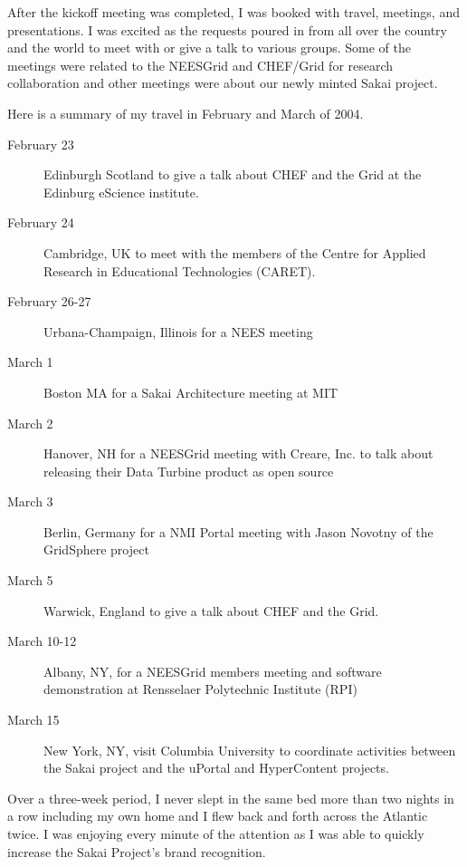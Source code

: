 \documentclass[12pt]{book}
\begin{document}

After the kickoff meeting was completed, I was booked with travel, meetings,
and presentations.  I was excited as the requests poured in from all over the country
and the world to meet with or give a talk to various groups.  Some of the meetings
were related to the NEESGrid and CHEF\slash Grid for research collaboration and other
meetings were about our newly minted Sakai project.

Here is a summary of my travel in February and March of 2004.

\begin{description}
\item[February 23] Edinburgh Scotland to give a talk about CHEF and the Grid
at the Edinburg eScience institute.

\item[February 24] Cambridge, UK to meet with the members of the Centre for
Applied Research in Educational Technologies (CARET).

\item[February 26-27] Urbana-Champaign, Illinois for a NEES meeting

\item[March 1] Boston MA for a Sakai Architecture meeting at MIT

\item[March 2] Hanover, NH for a NEESGrid meeting with Creare, Inc. to talk about
releasing their Data Turbine product as open source

\item[March 3] Berlin, Germany for a NMI Portal meeting with Jason Novotny of the
GridSphere project

\item[March 5] Warwick, England to give a talk about CHEF and the Grid.

\item[March 10-12] Albany, NY, for a NEESGrid members meeting and software demonstration
at Rensselaer Polytechnic Institute (RPI)

\item[March 15] New York, NY, visit Columbia University to coordinate activities between
the Sakai project and the uPortal and HyperContent projects.

\end{description}

Over a three-week period, I never slept in the same bed more than two nights
in a row including my own home and I flew back and forth across the
Atlantic twice. I was enjoying every minute of the attention as I was able to quickly
increase the Sakai Project's brand recognition.
\end{document}
